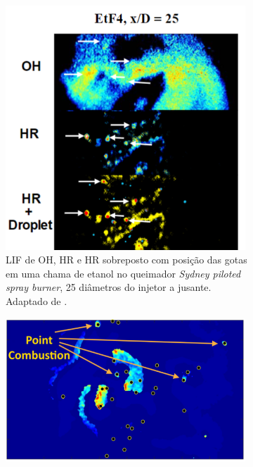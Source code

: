 \begin{figure}[H]
    \centering
    \caption{Observações experimentais de combustão de gota isolada em chamas de etanol na Fig. \ref{fig:GounderJ2009-7.17} e \ref{fig:SinghG2020-10}, indicadas por setas, e ao redor de uma partícula de pó de alumínio na Fig. \ref{fig:Braconnier202PhD-5.20}. 
    Siglas: LIF -- \emph{Laser Induced Fluorescence}; HR -- \emph{Heat Release}.
    Adaptadas de \cite{GounderJ2009PhD,SinghG2020,Braconnier2020Pre}.
    }
    \begin{subfigure}[t]{0.39\textwidth}
        \centering
        \includegraphics[width=0.99\textwidth]{30_images/GounderJ2009-7.17-1.png}
        \caption{LIF de OH, HR e HR sobreposto com posição das gotas em uma chama de etanol no queimador \emph{Sydney piloted spray burner}, 25 diâmetros do injetor a jusante. Adaptado de \cite[Fig. 7.13]{GounderJ2009PhD}.}
        \label{fig:GounderJ2009-7.17}
    \end{subfigure}
    \hfill
    \begin{subfigure}[t]{0.59\textwidth}
        \centering
        \includegraphics[width=0.99\textwidth]{30_images/SinghG2020-10.png}

\end{subfigure}
\end{figure}
